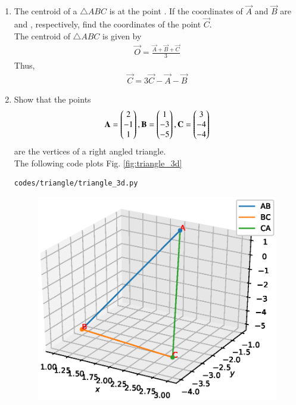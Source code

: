 \begin{enumerate}[label=\arabic*.,ref=\thesubsection.\theenumi]
%
\item The centroid of a $\triangle ABC$ is at the point .  If the coordinates of $\vec{A}$ and $\vec{B}$ are  and , respectively, find the coordinates of the point $\vec{C}$.
%
\\
\solution The centroid of $\triangle ABC$ is given by
\begin{align}
\label{eq:tri_geo_ex_centroid}
\vec{O} = \frac{\vec{A}+\vec{B}+\vec{C}}{3}
\end{align}
%
Thus, 
\begin{align}
\vec{C} = 3\vec{C}-\vec{A}-\vec{B}
\end{align}
%
\item Show that the points 
\begin{align}
\mathbf{A} = \begin{pmatrix}2\\-1 \\1\end{pmatrix},
\mathbf{B} = \begin{pmatrix}1\\-3 \\-5\end{pmatrix},
\mathbf{C} = \begin{pmatrix}3\\ -4\\-4\end{pmatrix}
\end{align}
%
are the vertices of a right angled triangle.
\\
\solution 
The following code plots Fig. \ref{fig:triangle_3d}
%
\begin{lstlisting}
codes/triangle/triangle_3d.py
\end{lstlisting}
%
\begin{figure}[!ht]
\includegraphics[width=\columnwidth]{./triangle/figs/triangle_3d.eps}

\end{figure}
\end{enumerate}
